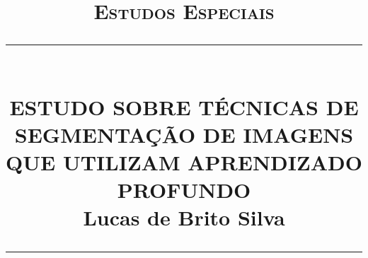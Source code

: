 \newcommand{\HRule}[1]{\rule{\linewidth}{#1}}
\begin{titlepage}
    \title{
        \normalsize  \textsc{Estudos Especiais} \\ [2.0cm]
		\HRule{0.5pt} \\  [0.75cm]
		\LARGE \textbf{\uppercase{ESTUDO SOBRE TÉCNICAS DE SEGMENTAÇÃO DE IMAGENS QUE UTILIZAM APRENDIZADO PROFUNDO}} \\ [1.3cm]
		\large \textbf{Lucas de Brito Silva} \\ [0.5cm]
		\HRule{1.5pt} \\ [0.5cm]
		\normalsize \vspace*{5\baselineskip}
	}

	\date{}

    \maketitle
    \thispagestyle{empty}
\end{titlepage}